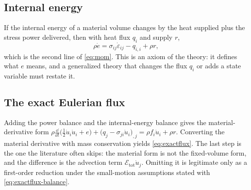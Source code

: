 \subsection*{Internal energy}
If the internal energy of a material volume changes by the heat supplied plus the stress power
delivered, then with heat flux $q_i$ and supply $r$,
\begin{equation}
\rho\dot e=\sigma_{ij}\dot\varepsilon_{ij}-q_{i,i}+\rho r ,
\end{equation}
which is the second line of \eqref{eq:mom}. This is an axiom of the theory: it defines what $e$ means, and
a generalized theory that changes the flux $q_i$ or adds a state variable must restate it.

\subsection*{The exact Eulerian flux}
Adding the power balance and the internal-energy balance gives the material-derivative form
$\rho\frac{\dd}{\dd t}\bigl(\tfrac12\dot u_i\dot u_i+e\bigr)+\bigl(q_j-\sigma_{ji}\dot u_i\bigr)_{,j}
=\rho f_i\dot u_i+\rho r$. Converting the material derivative with mass conservation yields
\eqref{eq:exactflux}. The last step is the one the literature often skips: the material form is not the
fixed-volume form, and the difference is the advection term $\mathcal E_{\mathrm{tot}}\dot u_j$.
Omitting it is legitimate only as a first-order reduction under the small-motion assumptions stated with
\eqref{eq:exactflux-balance}.
